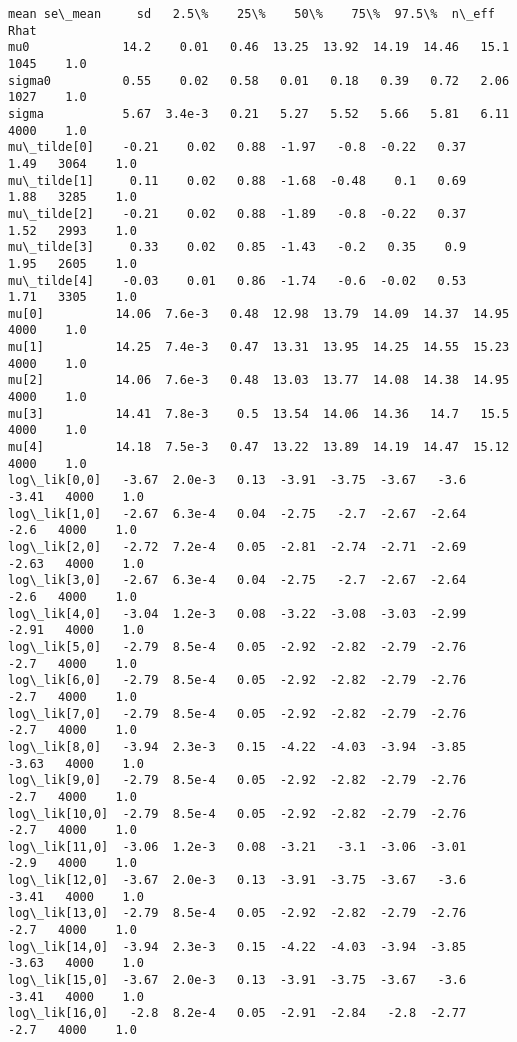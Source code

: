 \documentclass[11pt]{article}
\begin{document}
\begin{Verbatim}[commandchars=\\\{\}]
                mean se\_mean     sd   2.5\%    25\%    50\%    75\%  97.5\%  n\_eff   Rhat
mu0             14.2    0.01   0.46  13.25  13.92  14.19  14.46   15.1   1045    1.0
sigma0          0.55    0.02   0.58   0.01   0.18   0.39   0.72   2.06   1027    1.0
sigma           5.67  3.4e-3   0.21   5.27   5.52   5.66   5.81   6.11   4000    1.0
mu\_tilde[0]    -0.21    0.02   0.88  -1.97   -0.8  -0.22   0.37   1.49   3064    1.0
mu\_tilde[1]     0.11    0.02   0.88  -1.68  -0.48    0.1   0.69   1.88   3285    1.0
mu\_tilde[2]    -0.21    0.02   0.88  -1.89   -0.8  -0.22   0.37   1.52   2993    1.0
mu\_tilde[3]     0.33    0.02   0.85  -1.43   -0.2   0.35    0.9   1.95   2605    1.0
mu\_tilde[4]    -0.03    0.01   0.86  -1.74   -0.6  -0.02   0.53   1.71   3305    1.0
mu[0]          14.06  7.6e-3   0.48  12.98  13.79  14.09  14.37  14.95   4000    1.0
mu[1]          14.25  7.4e-3   0.47  13.31  13.95  14.25  14.55  15.23   4000    1.0
mu[2]          14.06  7.6e-3   0.48  13.03  13.77  14.08  14.38  14.95   4000    1.0
mu[3]          14.41  7.8e-3    0.5  13.54  14.06  14.36   14.7   15.5   4000    1.0
mu[4]          14.18  7.5e-3   0.47  13.22  13.89  14.19  14.47  15.12   4000    1.0
log\_lik[0,0]   -3.67  2.0e-3   0.13  -3.91  -3.75  -3.67   -3.6  -3.41   4000    1.0
log\_lik[1,0]   -2.67  6.3e-4   0.04  -2.75   -2.7  -2.67  -2.64   -2.6   4000    1.0
log\_lik[2,0]   -2.72  7.2e-4   0.05  -2.81  -2.74  -2.71  -2.69  -2.63   4000    1.0
log\_lik[3,0]   -2.67  6.3e-4   0.04  -2.75   -2.7  -2.67  -2.64   -2.6   4000    1.0
log\_lik[4,0]   -3.04  1.2e-3   0.08  -3.22  -3.08  -3.03  -2.99  -2.91   4000    1.0
log\_lik[5,0]   -2.79  8.5e-4   0.05  -2.92  -2.82  -2.79  -2.76   -2.7   4000    1.0
log\_lik[6,0]   -2.79  8.5e-4   0.05  -2.92  -2.82  -2.79  -2.76   -2.7   4000    1.0
log\_lik[7,0]   -2.79  8.5e-4   0.05  -2.92  -2.82  -2.79  -2.76   -2.7   4000    1.0
log\_lik[8,0]   -3.94  2.3e-3   0.15  -4.22  -4.03  -3.94  -3.85  -3.63   4000    1.0
log\_lik[9,0]   -2.79  8.5e-4   0.05  -2.92  -2.82  -2.79  -2.76   -2.7   4000    1.0
log\_lik[10,0]  -2.79  8.5e-4   0.05  -2.92  -2.82  -2.79  -2.76   -2.7   4000    1.0
log\_lik[11,0]  -3.06  1.2e-3   0.08  -3.21   -3.1  -3.06  -3.01   -2.9   4000    1.0
log\_lik[12,0]  -3.67  2.0e-3   0.13  -3.91  -3.75  -3.67   -3.6  -3.41   4000    1.0
log\_lik[13,0]  -2.79  8.5e-4   0.05  -2.92  -2.82  -2.79  -2.76   -2.7   4000    1.0
log\_lik[14,0]  -3.94  2.3e-3   0.15  -4.22  -4.03  -3.94  -3.85  -3.63   4000    1.0
log\_lik[15,0]  -3.67  2.0e-3   0.13  -3.91  -3.75  -3.67   -3.6  -3.41   4000    1.0
log\_lik[16,0]   -2.8  8.2e-4   0.05  -2.91  -2.84   -2.8  -2.77   -2.7   4000    1.0

\end{Verbatim}
\end{document}
